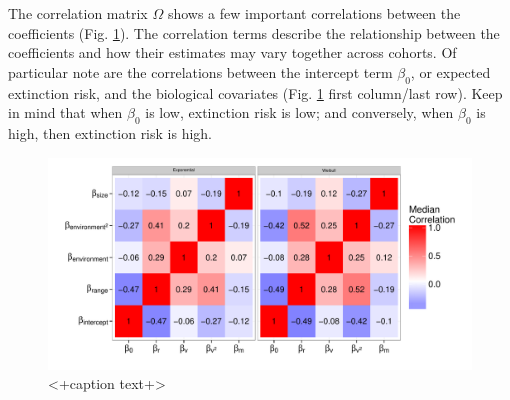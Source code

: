 \documentclass[12pt,letterpaper]{article}
\begin{document}
The correlation matrix \(\Omega\) shows a few important correlations between the coefficients (Fig. \ref{fig:omega}). The correlation terms describe the relationship between the coefficients and how their estimates may vary together across cohorts. Of particular note are the correlations between the intercept term \(\beta_{0}\), or expected extinction risk, and the biological covariates (Fig. \ref{fig:omega} first column/last row). Keep in mind that when \(\beta_{0}\) is low, extinction risk is low; and conversely, when \(\beta_{0}\) is high, then extinction risk is high.
\begin{figure}[ht]
  \centering
  \includegraphics[height = 0.5\textheight,width=\textwidth,keepaspectratio=true]{figure/correlation_heatmap}
  \caption{<+caption text+>}
  \label{fig:omega}
\end{figure}
\end{document}
